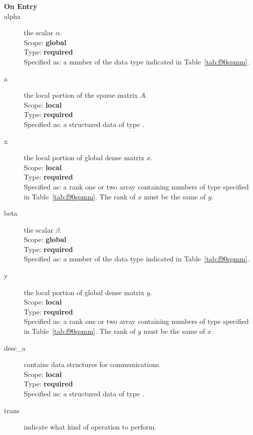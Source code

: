 \begin{description}
\item[\bf On Entry]
\item[alpha] the scalar $\alpha$.\\
Scope: {\bf global} \\
Type: {\bf required}\\
Specified as: a number of the data type indicated in
Table~\ref{tab:f90spmm}. 
\item[a] the local portion of the sparse matrix
$A$. \\ 
Scope: {\bf local} \\
Type: {\bf required}\\
Specified as: a structured data of type \spdata.
\item[x] the local portion of global dense matrix
$x$. %
\\
Scope: {\bf local} \\
Type: {\bf required} \\
Specified as:  a rank one or two array
containing numbers of type specified in
Table~\ref{tab:f90spmm}.  The rank of $x$ must be the same of $y$. 
\item[beta] the scalar $\beta$.\\
Scope: {\bf global} \\
Type: {\bf required} \\
Specified as: a number of the data type indicated in Table~\ref{tab:f90spmm}.
\item[y] the local portion of global dense matrix
$y$. %
\\
Scope: {\bf local} \\
Type: {\bf required} \\
Specified as:  a rank one or two array 
containing numbers of type specified in
Table~\ref{tab:f90spmm}. The rank of $y$ must be the same of $x$. 
\item[desc\_a] contains data structures for communications.\\
Scope: {\bf local} \\
Type: {\bf required}\\
Specified as: a structured data of type \descdata.
\item[trans] indicate what kind of operation to perform.

\end{description}
